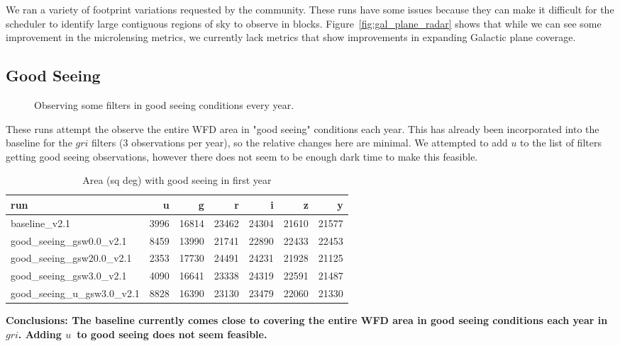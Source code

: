 We ran a variety of footprint variations requested by the community. These runs have some issues because they can make it difficult for the scheduler to identify large contiguous regions of sky to observe in blocks. Figure~\ref{fig:gal_plane_radar} shows that while we can see some improvement in the microlensing metrics, we currently lack metrics that show improvements in expanding Galactic plane coverage.



\subsection{Good Seeing}


\begin{figure}
\caption{Observing some filters in good seeing conditions every year. }
\end{figure}


These runs attempt the observe the entire WFD area in "good seeing" conditions each year. This has already been incorporated into the baseline for the $gri$ filters (3 observations per year), so the relative changes here are minimal. We attempted to add $u$ to the list of filters getting good seeing observations, however there does not seem to be enough dark time to make this feasible.


\begin{table}
\caption{Area (sq deg) with good seeing in first year}
\begin{tabular}{lrrrrrr}
                      run &    u &     g &     r &     i &     z &     y \\
                      \hline
            baseline\_v2.1 & 3996 & 16814 & 23462 & 24304 & 21610 & 21577 \\
  good\_seeing\_gsw0.0\_v2.1 & 8459 & 13990 & 21741 & 22890 & 22433 & 22453 \\
 good\_seeing\_gsw20.0\_v2.1 & 2353 & 17730 & 24491 & 24231 & 21928 & 21125 \\
  good\_seeing\_gsw3.0\_v2.1 & 4090 & 16641 & 23338 & 24319 & 22591 & 21487 \\
good\_seeing\_u\_gsw3.0\_v2.1 & 8828 & 16390 & 23130 & 23479 & 22060 & 21330 \\
\end{tabular}
\end{table}

{\bf Conclusions: The baseline currently comes close to covering the entire WFD area in good seeing conditions each year in $gri$. Adding $u$\ to good seeing does not seem feasible.}

